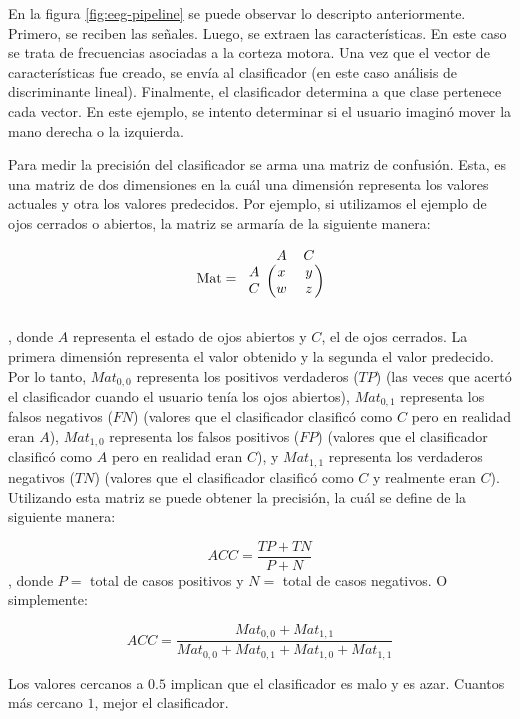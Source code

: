 En la figura \ref{fig:eeg-pipeline} se puede observar lo descripto anteriormente. Primero, se reciben las señales. Luego, se extraen las características. En este caso se trata de frecuencias asociadas a la corteza motora. Una vez que el vector de características fue creado, se envía al clasificador (en este caso análisis de discriminante lineal). Finalmente, el clasificador determina a que clase pertenece cada vector. En este ejemplo, se intento determinar si el usuario imaginó mover la mano derecha o la izquierda. 

Para medir la precisión del clasificador se arma una matriz de confusión. Esta, es una matriz de dos dimensiones en la cuál una dimensión representa los valores actuales y otra los valores predecidos. Por ejemplo, si utilizamos el ejemplo de ojos cerrados o abiertos, la matriz se armaría de la siguiente manera:

\[
\textrm{Mat} = \begin{blockarray}{ccc}
& A & C \\
\begin{block}{c(cc)}
  A & x & y \\
  C & w & z \\
\end{block}
\end{blockarray}
 \]
 
 , donde $ A $ representa el estado de ojos abiertos y $ C $, el de ojos cerrados. La primera dimensión representa el valor obtenido y la segunda el valor predecido. Por lo tanto, $Mat_{0,0}$ representa los positivos verdaderos ($TP$) (las veces que acertó el clasificador cuando el usuario tenía los ojos abiertos), $Mat_{0,1}$ representa los falsos negativos ($FN$) (valores que el clasificador clasificó como $C$ pero en realidad eran $A$), $Mat_{1,0}$ representa los falsos positivos ($FP$) (valores que el clasificador clasificó como $A$ pero en realidad eran $C$), y $Mat_{1,1}$ representa los verdaderos negativos ($TN$) (valores que el clasificador clasificó como $C$ y realmente eran $C$). Utilizando esta matriz se puede obtener la precisión, la cuál se define de la siguiente manera:
 
$$ ACC = \frac{TP + TN}{P + N} $$ 
, donde $P =$ total de casos positivos y $ N =$ total de casos negativos. O simplemente:

$$ ACC = \frac{Mat_{0,0} + Mat_{1,1}}{Mat_{0,0} + Mat_{0,1} + Mat_{1,0} + Mat_{1,1}} $$ 

Los valores cercanos a $0.5$ implican que el clasificador es malo y es azar. Cuantos más cercano $1$, mejor el clasificador.

